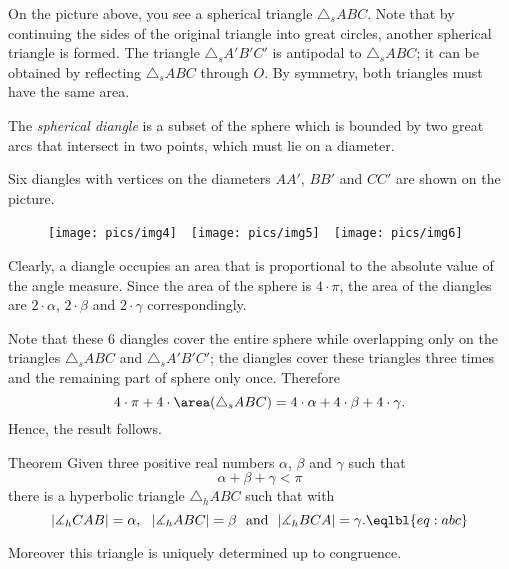 On the picture above, you see a spherical triangle $\triangle_sABC$.
Note that by continuing the sides of the original triangle into
great circles, another spherical triangle is formed. The triangle $\triangle_sA'B'C'$
is antipodal to $\triangle_sABC$; it can be obtained by reflecting $\triangle_sABC$ through $O$. 
By symmetry, both triangles must
have the same area.

The \emph{spherical diangle} is a subset of the sphere which is bounded by two great arcs that intersect in two points, which must lie on a diameter. 

Six diangles
with vertices on the diameters $AA'$, $BB'$ and $CC'$ are shown on the picture.

\begin{figure}[h]
\texttt{[image: pics/img4]}\ \ 
\texttt{[image: pics/img5]}\ \ 
\texttt{[image: pics/img6]}
\end{figure}

Clearly, a diangle occupies an area that is proportional to the absolute value of the angle measure. 
Since the area of the sphere
is $4\cdot\pi$, 
the area of the diangles are $2\cdot\alpha$, $2\cdot\beta$ and $2\cdot\gamma$ correspondingly.

Note that these 6 diangles cover the entire sphere while overlapping
only on the triangles $\triangle_s ABC$ and $\triangle_s A'B'C'$;
the diangles cover these triangles three times and the remaining part of sphere only once.
Therefore 
$$
4\cdot\pi + 4\cdot\area(\triangle_s ABC)= 4\cdot \alpha+4\cdot \beta+4\cdot\gamma.
$$
Hence, the result follows.
\qeds













\begin{thm}{Theorem}\label{thm:sum-trig-h}
Given three positive real numbers $\alpha$, $\beta$ and $\gamma$ such that
$$\alpha+\beta+\gamma<\pi$$ 
there is a hyperbolic triangle $\triangle_hABC$
such that with
$$|\measuredangle_hCAB|=\alpha,\ \ |\measuredangle_hABC|=\beta\ \ \text{and}\ \ |\measuredangle_hBCA|=\gamma.\eqlbl{eq:abc}$$
 
Moreover this triangle is uniquely determined up to congruence. 
\end{thm}


